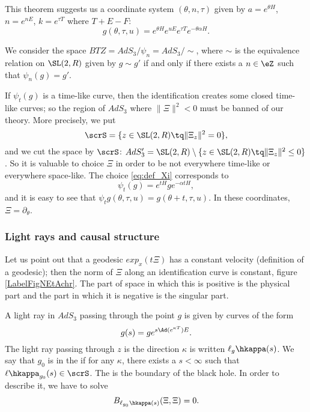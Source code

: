 This theorem suggests us a coordinate system $(\theta,n,\tau)$ given by $a=e^{\theta H}$, $n=e^{n E}$, $k=e^{\tau T}$ where $T+E-F$:
\[
g(\theta,\tau,u)=e^{\theta H}e^{uE}e^{\tau T}e^{-\theta\alpha H}.
\]

We consider the space $BTZ=AdS_3/\psi_n=AdS_3/\sim$, where $\sim$ is the equivalence relation on $\SL(2,R)$ given by $g\sim g'$ if and only if there exists a $n\in\eZ$ such that $\psi_n(g)=g'$.

If $\psi_t(g)$ is a time-like curve, then the identification creates some closed time-like curves; so the region of $AdS_3$ where $\|\Xi\|^2<0$ must be banned of our theory. More precisely, we put
\[
\scrS=\{z\in\SL(2,R)\tq \|\Xi_z\|^2=0\},
\]
and we cut the space by $\scrS$: $AdS_3'=\SL(2,R)\setminus \{z\in\SL(2,R)\tq \|\Xi_z\|^2\leq 0\}$. So it is valuable to choice $\Xi$ in order to be not everywhere time-like or everywhere space-like. The choice \eqref{eq:def_Xi} corresponds to 
\begin{equation}
\psi_t(g)=e^{tH}ge^{-\alpha tH},
\end{equation}
and it is easy to see that $\psi_tg(\theta,\tau,u)=g(\theta+t,\tau,u)$. In these coordinates, $\Xi=\partial_{\theta}$.

\subsubsection{Light rays and causal structure}

Let us point out that a geodesic $exp_x(t\Xi)$ has a constant velocity (definition of a geodesic); then the norm of $\Xi$ along an identification curve is constant, figure \ref{LabelFigNEtAchr}. The part of space in which this is positive is the physical part and the part in which it is negative is the singular part.

\newcommand{\CaptionFigNEtAchr}{The norm (in particular its sing) of \( \Xi\) is contant along a geodesic.}


A light ray in $AdS_3$ passing through the point $g$ is given by curves of the form
\begin{equation}
 g(s)=ge^{s\Ad(e^{\kappa T})E}.
\end{equation}
The light ray passing through $z$ is the direction $\kappa$ is written $\ell_g\hkappa(s)$. We say that $g_0$ is in the  if for any $\kappa$, there exists a $s<\infty$ such that $\ell\hkappa_{g_0}(s)\in\scrS$. The  is the boundary of the black hole. In order to describe it, we have to solve 
\begin{equation}
 B_{\ell_{g_0}\hkappa(s)}(\Xi,\Xi)=0.
\end{equation}
